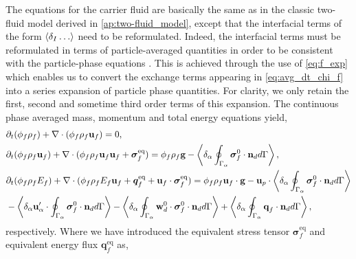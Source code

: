 The equations for the carrier fluid are basically the same as in the classic two-fluid model derived in \ref{ap:two-fluid_model}, except that the interfacial terms of the form $\left<\delta_I \ldots \right>$ need to be reformulated.
Indeed, the interfacial terms must be reformulated in terms of particle-averaged quantities in order to be consistent with the particle-phase equations \citep{jackson1997locally,zhang1994averaged}. 
This is achieved through the use of \ref{eq:f_exp} which enables us to convert the exchange terms appearing in \ref{eq:avg_dt_chi_f} into a series expansion of particle phase quantities. 
For clarity, we only retain the first, second and sometime third order terms of this expansion. 
The continuous phase averaged mass, momentum and total energy equations yield, 
\begin{align}
    \label{eq:dt_hybrid_rho}
    &\partial_t (\phi_f \rho_f)  
    + \mathbf{\nabla}\cdot (
        \phi_f \rho_f\textbf{u}_f
    )
    = 
    0,\\
    \label{eq:dt_hybrid_rhou_f}
    &\partial_t (\phi_f \rho_f\textbf{u}_f)  
    + \mathbf{\nabla}\cdot (
        \phi_f \rho_f\textbf{u}_f\textbf{u}_f
        + \bm{\sigma}_f^\text{eq}
    )
    = 
    \phi_f \rho_f \textbf{g} 
    - \left<\delta_\alpha \oint_{\Gamma_{\alpha}} {\bm{\sigma}_f^0 \cdot \textbf{n}_d} d\Gamma\right>,
    \\
    \label{eq:dt_hybrid_rhoE_f}
    &\partial_t (\phi_f\rho_fE_f)  
    + \mathbf{\nabla}\cdot (
        \phi_f\rho_fE_f\textbf{u}_f
        + \bm{q}_f^\text{eq}
        + \textbf{u}_f \cdot \bm{\sigma}_f^\text{eq}
        )
    = 
    \phi_f \rho_f\textbf{u}_f \cdot \textbf{g} 
    - \textbf{u}_p \cdot \left<\delta_\alpha \oint_{\Gamma_{\alpha}} {\bm{\sigma}_f^0 \cdot \textbf{n}_d} d\Gamma\right>\nonumber \\
    &- \left<\delta_\alpha  \textbf{u}_\alpha' \cdot \oint_{\Gamma_{\alpha}}   \bm{\sigma}_f^0 \cdot \textbf{n}_d d\Gamma\right>
    - \left<\delta_\alpha  \oint_{\Gamma_{\alpha}} \textbf{w}_d^0 \cdot \bm{\sigma}_f^0 \cdot \textbf{n}_d d\Gamma\right>
    + \left<\delta_\alpha \oint_{\Gamma_{\alpha}} {\textbf{q}_f\cdot \textbf{n}_d} d\Gamma\right>,
\end{align} 
respectively. 
Where we have introduced the equivalent stress tensor $\bm{\sigma}_f^\text{eq}$ and equivalent energy flux $\textbf{q}^\text{eq}_f$ as,
